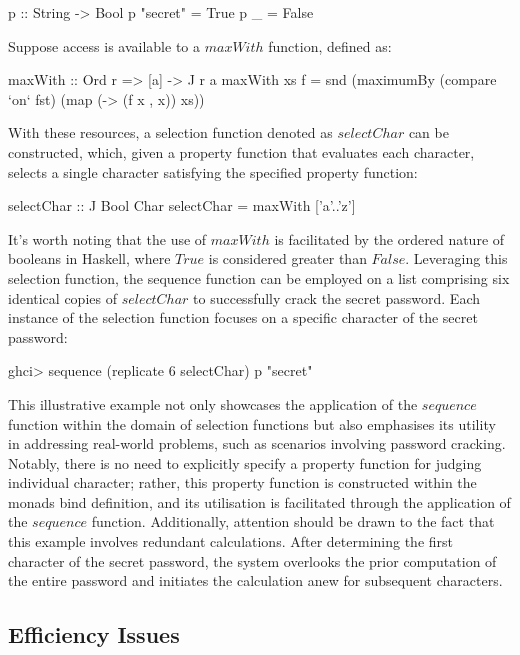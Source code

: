\documentclass[runningheads]{llncs}
\begin{document}
\begin{code}
p :: String -> Bool
p "secret" = True
p _        = False
\end{code}

Suppose access is available to a \(maxWith\) function, defined as:

\begin{code}
maxWith :: Ord r => [a] -> J r a
maxWith xs f = snd (maximumBy (compare `on` fst) 
                              (map (\x -> (f x , x)) xs))
\end{code}

With these resources, a selection function denoted as \(selectChar\) can
be constructed, which, given a property function that evaluates each
character, selects a single character satisfying the specified property
function:

\begin{code}
selectChar :: J Bool Char
selectChar = maxWith ['a'..'z']
\end{code}

It's worth noting that the use of \(maxWith\) is facilitated by the
ordered nature of booleans in Haskell, where \(True\) is considered
greater than \(False\). Leveraging this selection function, the sequence
function can be employed on a list comprising six identical copies of
\(selectChar\) to successfully crack the secret password. Each instance
of the selection function focuses on a specific character of the secret
password:

\begin{haskell}
ghci> sequence (replicate 6 selectChar) p
"secret"
\end{haskell}

This illustrative example not only showcases the application of the
\(sequence\) function within the domain of selection functions but also
emphasises its utility in addressing real-world problems, such as
scenarios involving password cracking. Notably, there is no need to
explicitly specify a property function for judging individual character;
rather, this property function is constructed within the monads bind
definition, and its utilisation is facilitated through the application
of the \(sequence\) function. Additionally, attention should be drawn to
the fact that this example involves redundant calculations. After
determining the first character of the secret password, the system
overlooks the prior computation of the entire password and initiates the
calculation anew for subsequent characters.

\subsection{Efficiency Issues}\label{efficiency-issues}
\end{document}
